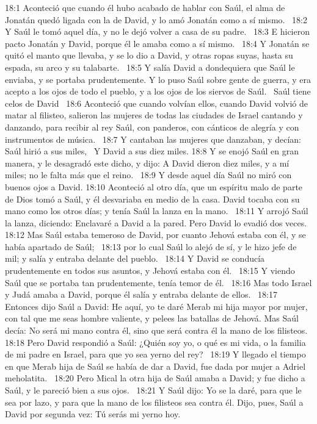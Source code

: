 18:1 Aconteció que cuando él hubo acabado de hablar con Saúl, el alma de Jonatán quedó ligada con la de David, y lo amó Jonatán como a sí mismo.  
18:2 Y Saúl le tomó aquel día, y no le dejó volver a casa de su padre.  
18:3 E hicieron pacto Jonatán y David, porque él le amaba como a sí mismo.  
18:4 Y Jonatán se quitó el manto que llevaba, y se lo dio a David, y otras ropas suyas, hasta su espada, su arco y su talabarte.  
18:5 Y salía David a dondequiera que Saúl le enviaba, y se portaba prudentemente. Y lo puso Saúl sobre gente de guerra, y era acepto a los ojos de todo el pueblo, y a los ojos de los siervos de Saúl.  
Saúl tiene celos de David  
18:6 Aconteció que cuando volvían ellos, cuando David volvió de matar al filisteo, salieron las mujeres de todas las ciudades de Israel cantando y danzando, para recibir al rey Saúl, con panderos, con cánticos de alegría y con instrumentos de música.  
18:7 Y cantaban las mujeres que danzaban, y decían:  
Saúl hirió a sus miles,  
Y David a sus diez miles. 
18:8 Y se enojó Saúl en gran manera, y le desagradó este dicho, y dijo: A David dieron diez miles, y a mí miles; no le falta más que el reino.  
18:9 Y desde aquel día Saúl no miró con buenos ojos a David. 
18:10 Aconteció al otro día, que un espíritu malo de parte de Dios tomó a Saúl, y él desvariaba en medio de la casa. David tocaba con su mano como los otros días; y tenía Saúl la lanza en la mano.  
18:11 Y arrojó Saúl la lanza, diciendo: Enclavaré a David a la pared. Pero David lo evadió dos veces.  
18:12 Mas Saúl estaba temeroso de David, por cuanto Jehová estaba con él, y se había apartado de Saúl;  
18:13 por lo cual Saúl lo alejó de sí, y le hizo jefe de mil; y salía y entraba delante del pueblo.  
18:14 Y David se conducía prudentemente en todos sus asuntos, y Jehová estaba con él.  
18:15 Y viendo Saúl que se portaba tan prudentemente, tenía temor de él.  
18:16 Mas todo Israel y Judá amaba a David, porque él salía y entraba delante de ellos.  
18:17 Entonces dijo Saúl a David: He aquí, yo te daré Merab mi hija mayor por mujer, con tal que me seas hombre valiente, y pelees las batallas de Jehová. Mas Saúl decía: No será mi mano contra él, sino que será contra él la mano de los filisteos.  
18:18 Pero David respondió a Saúl: ¿Quién soy yo, o qué es mi vida, o la familia de mi padre en Israel, para que yo sea yerno del rey?  
18:19 Y llegado el tiempo en que Merab hija de Saúl se había de dar a David, fue dada por mujer a Adriel meholatita.  
18:20 Pero Mical la otra hija de Saúl amaba a David; y fue dicho a Saúl, y le pareció bien a sus ojos.  
18:21 Y Saúl dijo: Yo se la daré, para que le sea por lazo, y para que la mano de los filisteos sea contra él. Dijo, pues, Saúl a David por segunda vez: Tú serás mi yerno hoy.  
